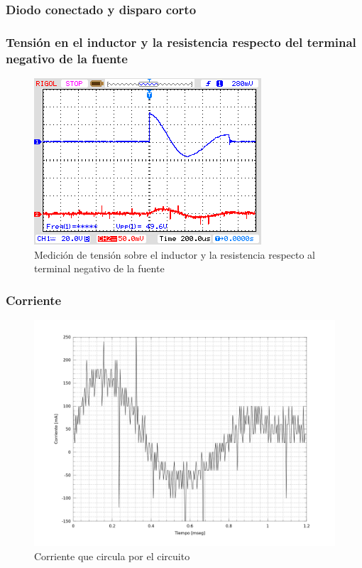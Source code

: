 \documentclass[a4paper,10pt]{article}
\begin{document}
\subsubsection{Diodo conectado y disparo corto}

\subsubsection*{Tensión en el inductor y la resistencia respecto del terminal negativo de la fuente}

\begin{figure}[H] %
\begin{center}
\includegraphics[scale=0.8]{./imagenes/tiristor_medicion2.png}
\caption{Medición de tensión sobre el inductor y la resistencia respecto al terminal negativo de la fuente}
 \label{fig:Med2_tiristor}
\end{center}
\end{figure}

\subsubsection*{Corriente}

\begin{figure}[H] %
\begin{center}
\includegraphics[scale=0.3]{./imagenes/Corriente2.png}
\caption{Corriente que circula por el circuito}
 \label{fig:Corriente2_tiristor}
\end{center}
\end{figure}
\end{document}

